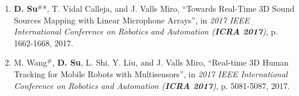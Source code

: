 \documentclass[margin,line]{res}
\begin{document}
\begin{resume}
\begin{enumerate}


\item {\bf D. Su}$^{\#}$*, T. Vidal Calleja, and J. Valls Miro, ``Towards Real-Time 3D Sound Sources Mapping with Linear Microphone Arrays'', in {\it 2017 IEEE International Conference on Robotics and Automation (\textbf{ICRA 2017})}, p. 1662-1668, 2017.

\item M. Wang$^{\#}$, {\bf D. Su}, L. Shi, Y. Liu, and J. Valls Miro, ``Real-time 3D Human Tracking for Mobile Robots with Multisensors'', in {\it 2017 IEEE International Conference on Robotics and Automation (\textbf{ICRA 2017})}, p. 5081-5087, 2017.


\end{enumerate}
\end{resume}
\end{document}
